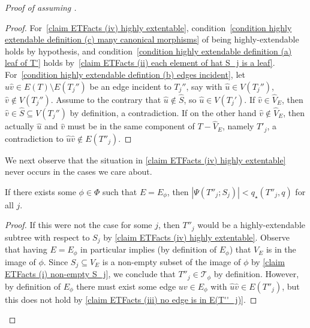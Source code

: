 \documentclass[10pt,a4paper]{amsart}
\newcommand{\Pow}{{q_\star}} %
\newcommand{\sub}{\subseteq}
\renewcommand{\c}[1]{\mathcal{#1}}
\begin{document}
\begin{proof}[Proof of  assuming ]
\begin{proof}
			For~\ref{claim ETFacts (iv) highly extentable}, condition~\ref{condition highly extendable definition (c) many canonical morphisms} of being highly-extendable holds by hypothesis, and condition~\ref{condition highly extendable definition (a) leaf of T'} holds by~\ref{claim ETFacts (ii) each element of hat S_j is a leaf}. For~\ref{condition highly extendable defintion (b) edges incident}, let $\hat{u}\hat{v}\in E(T)\setminus E(T_j'')$ be an edge incident to $T_j''$, say with $\hat{u}\in V(T_j'')$, $\hat{v}\not\in V(T_j'')$. Assume to the contrary that $\hat{u}\not\in \widehat{S}$, so $\hat{u}\in V(T_j')$. If $\hat{v}\in \widehat{V}_E$, then $\hat{v}\in \widehat{S}\subseteq V(T_j'')$ by definition, a contradiction. If on the other hand $\hat{v}\not\in \widehat{V}_E$, then actually $\hat{u}$ and $\hat{v}$ must be in the same component of $T-\widehat{V}_E$, namely $T'_j$, a contradiction to $\hat{u}\hat{v}\notin E(T''_j)$.
		\end{proof}
		We next observe that the situation in \ref{claim ETFacts (iv) highly extentable} never occurs in the cases we care about.
		
		
		
		\begin{claim}\label{cl:ETSmall}
			If there exists some $\phi\in \Phi$ such that $E=E_\phi$, then $|\Psi(T''_j;S_j)|<\Pow(T''_j,q)$ for all $j$.
		\end{claim}
		
		\begin{proof}
			If this were not the case for some $j$, then $T''_j$ would be a highly-extendable subtree with respect to $S_j$ by \ref{claim ETFacts (iv) highly extentable}.  Observe that having $E=E_\phi$ in particular implies (by definition of $E_\phi$) that $V_E$ is in the image of $\phi$. Since $S_j\sub V_E$ is a non-empty subset of the image of $\phi$ by \ref{claim ETFacts (i) non-empty S_j}, we conclude that $T''_j\in\c{T}_\phi$ by definition.  However, by definition of $E_\phi$ there must exist some edge $uv\in E_\phi$ with $\hat{u}\hat{v}\in E(T''_j)$, but this does not hold by \ref{claim ETFacts (iii) no edge is in E(T''_j)}.
			
		\end{proof}
		

\end{proof}
\end{document}

